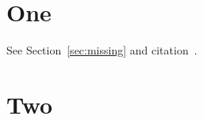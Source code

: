 \documentclass{article}
\begin{document}
\section{One}\label{sec:duplicate}
See Section~\ref{sec:missing} and citation~\cite{missing-citation}.
\section{Two}\label{sec:duplicate}
\end{document}
